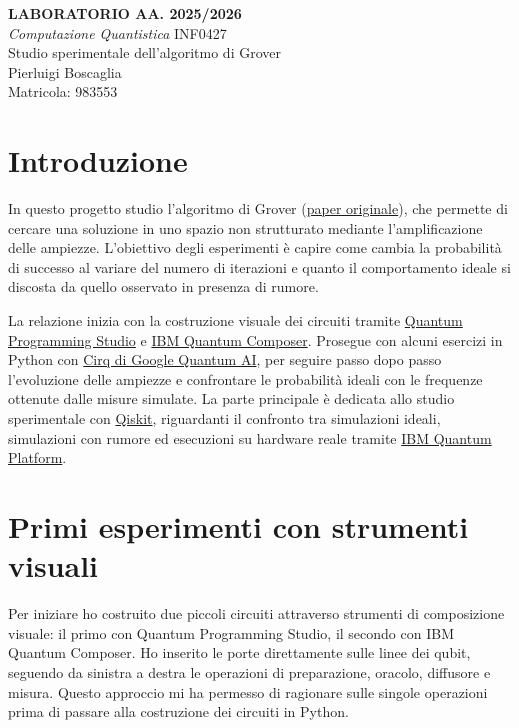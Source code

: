 ﻿\documentclass[a4paper,12pt]{article}
\begin{document}
\begin{center}
    {\Large\textbf{LABORATORIO AA. 2025/2026}}\\[0.2cm]
    {\large\textit{Computazione Quantistica} INF0427}\\[0.8cm]
    {\Large Studio sperimentale dell'algoritmo di Grover}\\[0.6cm]
    {\large Pierluigi Boscaglia}\\[0.15cm]
    Matricola: 983553
\end{center}
\vspace{0.5cm}

\section{Introduzione}
In questo progetto studio l'algoritmo di Grover
(\href{https://arxiv.org/abs/quant-ph/9605043}{paper originale}), che permette di cercare una
soluzione in uno spazio non strutturato mediante l'amplificazione delle
ampiezze. L'obiettivo degli esperimenti è capire come cambia la probabilità
di successo al variare del numero di iterazioni e quanto il comportamento
ideale si discosta da quello osservato in presenza di rumore.

La relazione inizia con la costruzione visuale dei circuiti tramite
\href{https://quantum-circuit.com/}{Quantum Programming Studio} e
\href{https://quantum.cloud.ibm.com/docs/en/guides/composer}{IBM Quantum Composer}.
Prosegue con alcuni esercizi in Python con
\href{https://quantumai.google/cirq}{Cirq di Google Quantum AI}, per seguire
passo dopo passo l'evoluzione delle ampiezze e confrontare le probabilità
ideali con le frequenze ottenute dalle misure simulate.
La parte principale è dedicata allo studio sperimentale con
\href{https://qiskit.org/}{Qiskit}, riguardanti il confronto tra
simulazioni ideali,
simulazioni con rumore ed esecuzioni su hardware reale tramite
\href{https://quantum.ibm.com/}{IBM Quantum Platform}.


\section{Primi esperimenti con strumenti visuali}
Per iniziare ho costruito due piccoli circuiti attraverso strumenti di
composizione visuale: il primo con Quantum Programming Studio,
il secondo con IBM Quantum Composer.
Ho inserito le porte direttamente sulle linee dei qubit, seguendo da sinistra
a destra le operazioni di preparazione, oracolo, diffusore e misura.
Questo approccio mi ha permesso di ragionare sulle singole operazioni prima
di passare alla costruzione dei circuiti in Python.
\end{document}
